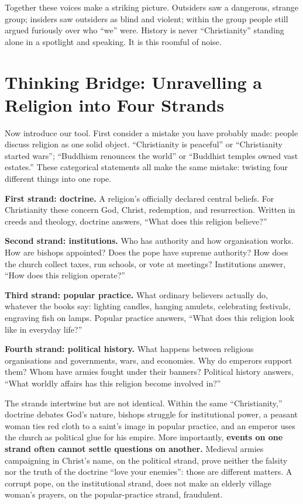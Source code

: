 Together these voices make a striking picture. Outsiders saw a dangerous, strange group; insiders saw outsiders as blind and violent; within the group people still argued furiously over who ``we'' were. History is never ``Christianity'' standing alone in a spotlight and speaking. It is this roomful of noise.

\section[Thinking Bridge: Four Strands]{Thinking Bridge: Unravelling a Religion into Four Strands}
Now introduce our tool. First consider a mistake you have probably made: people discuss religion as one solid object. ``Christianity is peaceful'' or ``Christianity started wars''; ``Buddhism renounces the world'' or ``Buddhist temples owned vast estates.'' These categorical statements all make the same mistake: twisting four different things into one rope.

\textbf{First strand: doctrine.} A religion's officially declared central beliefs. For Christianity these concern God, Christ, redemption, and resurrection. Written in creeds and theology, doctrine answers, ``What does this religion believe?''

\textbf{Second strand: institutions.} Who has authority and how organisation works. How are bishops appointed? Does the pope have supreme authority? How does the church collect taxes, run schools, or vote at meetings? Institutions answer, ``How does this religion operate?''

\textbf{Third strand: popular practice.} What ordinary believers actually do, whatever the books say: lighting candles, hanging amulets, celebrating festivals, engraving fish on lamps. Popular practice answers, ``What does this religion look like in everyday life?''

\textbf{Fourth strand: political history.} What happens between religious organisations and governments, wars, and economies. Why do emperors support them? Whom have armies fought under their banners? Political history answers, ``What worldly affairs has this religion become involved in?''

The strands intertwine but are not identical. Within the same ``Christianity,'' doctrine debates God's nature, bishops struggle for institutional power, a peasant woman ties red cloth to a saint's image in popular practice, and an emperor uses the church as political glue for his empire. More importantly, \textbf{events on one strand often cannot settle questions on another.} Medieval armies campaigning in Christ's name, on the political strand, prove neither the falsity nor the truth of the doctrine ``love your enemies'': those are different matters. A corrupt pope, on the institutional strand, does not make an elderly village woman's prayers, on the popular-practice strand, fraudulent.

